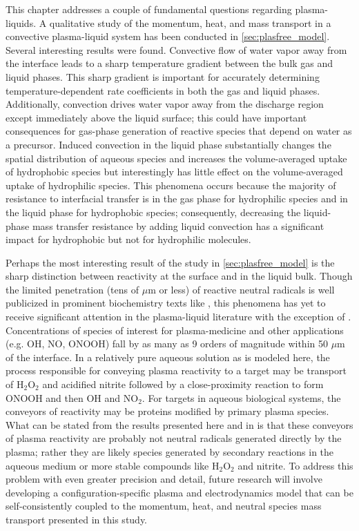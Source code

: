 This chapter addresses a couple of fundamental questions regarding plasma-liquids. A qualitative study of the momentum, heat, and mass transport in a convective plasma-liquid system has been conducted in \cref{sec:plasfree_model}. Several interesting results were found. Convective flow of water vapor away from the interface leads to a sharp temperature gradient between the bulk gas and liquid phases. This sharp gradient is important for accurately determining temperature-dependent rate coefficients in both the gas and liquid phases. Additionally, convection drives water vapor away from the discharge region except immediately above the liquid surface; this could have important consequences for gas-phase generation of reactive species that depend on water as a precursor. Induced convection in the liquid phase substantially changes the spatial distribution of aqueous species and increases the volume-averaged uptake of hydrophobic species but interestingly has little effect on the volume-averaged uptake of hydrophilic species. This phenomena occurs because the majority of resistance to interfacial transfer is in the gas phase for hydrophilic species and in the liquid phase for hydrophobic species; consequently, decreasing the liquid-phase mass transfer resistance by adding liquid convection has a significant impact for hydrophobic but not for hydrophilic molecules.

Perhaps the most interesting result of the study in \cref{sec:plasfree_model} is the sharp distinction between reactivity at the surface and in the liquid bulk. Though the limited penetration (tens of $\mu$m or less) of reactive neutral radicals is well publicized in prominent biochemistry texts like \cite{Halliwell}, this phenomena has yet to receive significant attention in the plasma-liquid literature with the exception of \cite{Chen2014a}. Concentrations of species of interest for plasma-medicine and other applications (e.g. OH, NO, ONOOH) fall by as many as 9 orders of magnitude within 50 $\mu$m of the interface. In a relatively pure aqueous solution as is modeled here, the process responsible for conveying plasma reactivity to a target may be transport of H$_2$O$_2$ and acidified nitrite followed by a close-proximity reaction to form ONOOH and then OH and NO$_2$. For targets in aqueous biological systems, the conveyors of reactivity may be proteins modified by primary plasma species. What can be stated from the results presented here and in \cite{Chen2014a} is that these conveyors of plasma reactivity are probably not neutral radicals generated directly by the plasma; rather they are likely species generated by secondary reactions in the aqueous medium or more stable compounds like H$_2$O$_2$ and nitrite. To address this problem with even greater precision and detail, future research will involve developing a configuration-specific plasma and electrodynamics model that can be self-consistently coupled to the momentum, heat, and neutral species mass transport presented in this study.

